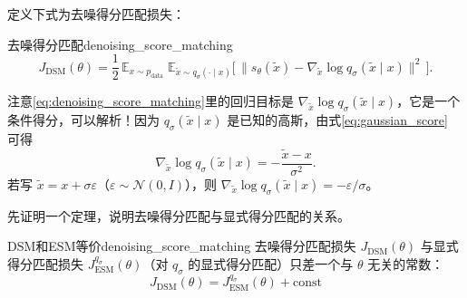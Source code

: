 定义下式为去噪得分匹配损失：
\begin{definition}{去噪得分匹配}{denoising_score_matching}
\begin{equation}\label{eq:denoising_score_matching}
J_{\text{DSM}}(\theta) = \frac{1}{2}\,\mathbb{E}_{x\sim p_{\text{data}}}\;\mathbb{E}_{\tilde x \sim q_\sigma(\cdot\mid x)}
\Big[\, \big\| s_\theta(\tilde x) - \nabla_{\tilde x}\log q_\sigma(\tilde x\mid x) \big\|^2 \,\Big].
\end{equation}
\end{definition}
注意\eqref{eq:denoising_score_matching}里的回归目标是 $\nabla_{\tilde x}\log q_\sigma(\tilde x\mid x)$，它是一个条件得分，可以解析！因为 $q_\sigma(\tilde x\mid x)$ 是已知的高斯，由式\eqref{eq:gaussian_score} 可得
\begin{equation}\label{eq:denoising_score}
\nabla_{\tilde x}\log q_\sigma(\tilde x \mid x) = -\frac{\tilde x - x}{\sigma^2}.
\end{equation}
若写 $\tilde x = x + \sigma\varepsilon$（$\varepsilon\sim\mathcal N(0,I)$），则 $\nabla_{\tilde x}\log q_\sigma(\tilde x\mid x) = -\varepsilon/\sigma$。

先证明一个定理\cite{vincent2011connection}，说明去噪得分匹配与显式得分匹配的关系。
\begin{theorem}{DSM和ESM等价}{denoising_score_matching}
    去噪得分匹配损失 $J_{\text{DSM}}(\theta)$ 与显式得分匹配损失 $J_{\text{ESM}}^{q_\sigma}(\theta)$（对 $q_\sigma$ 的显式得分匹配）只差一个与 $\theta$ 无关的常数：
\begin{equation}
J_{\text{DSM}}(\theta) = J_{\text{ESM}}^{q_\sigma}(\theta) + \text{const}
\end{equation}
\end{theorem}

